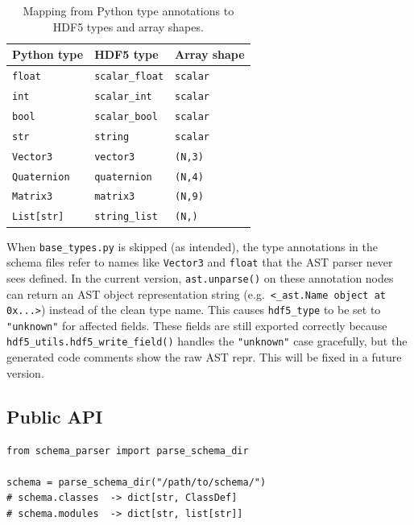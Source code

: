 \documentclass[11pt,a4paper]{article}
\begin{document}
\begin{table}[htbp]
\centering
\begin{tabular}{lll}
\toprule
\sffamily\textbf{Python type} & \sffamily\textbf{HDF5 type} & \sffamily\textbf{Array shape} \\
\midrule
\texttt{float}      & \texttt{scalar\_float}  & \texttt{scalar} \\
\texttt{int}        & \texttt{scalar\_int}    & \texttt{scalar} \\
\texttt{bool}       & \texttt{scalar\_bool}   & \texttt{scalar} \\
\texttt{str}        & \texttt{string}         & \texttt{scalar} \\
\texttt{Vector3}    & \texttt{vector3}        & \texttt{(N,3)}  \\
\texttt{Quaternion} & \texttt{quaternion}     & \texttt{(N,4)}  \\
\texttt{Matrix3}    & \texttt{matrix3}        & \texttt{(N,9)}  \\
\texttt{List[str]}  & \texttt{string\_list}   & \texttt{(N,)}   \\
\bottomrule
\end{tabular}
\caption{Mapping from Python type annotations to HDF5 types and array shapes.}
\end{table}

\begin{warnbox}
When \texttt{base\_types.py} is skipped (as intended), the type annotations
in the schema files refer to names like \texttt{Vector3} and \texttt{float}
that the AST parser never sees defined. In the current version,
\texttt{ast.unparse()} on these annotation nodes can return an AST object
representation string (e.g.\ \texttt{<\_ast.Name object at 0x...>}) instead
of the clean type name. This causes \texttt{hdf5\_type} to be set to
\texttt{"unknown"} for affected fields. These fields are still exported
correctly because \texttt{hdf5\_utils.hdf5\_write\_field()} handles the
\texttt{"unknown"} case gracefully, but the generated code comments show the
raw AST repr. This will be fixed in a future version.
\end{warnbox}

\subsection{Public API}

\begin{lstlisting}
from schema_parser import parse_schema_dir

schema = parse_schema_dir("/path/to/schema/")
# schema.classes  -> dict[str, ClassDef]
# schema.modules  -> dict[str, list[str]]
\end{lstlisting}
\end{document}
